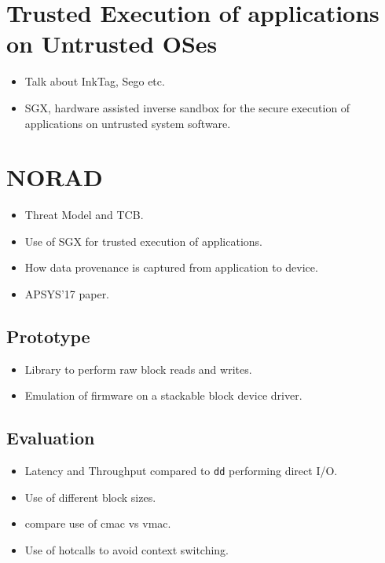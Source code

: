 \documentclass[withindex,glossary]{cam-thesis}
\begin{document}
\section{Trusted Execution of applications on Untrusted OSes}
\begin{itemize}
\item Talk about InkTag, Sego etc.
\item SGX, hardware assisted inverse sandbox for the secure execution of applications on untrusted system software.
\end{itemize}

\section{NORAD}
\begin{itemize}
\item Threat Model and TCB.
\item Use of SGX for trusted execution of applications.
\item How data provenance is captured from application to device.
\item APSYS'17 paper.
\end{itemize}

\subsection{Prototype}
\begin{itemize}
\item Library to perform raw block reads and writes.
\item Emulation of firmware on a stackable block device driver.
\end{itemize}

\subsection{Evaluation}
\begin{itemize}
\item Latency and Throughput compared to \texttt{dd} performing direct I/O.
\item Use of different block sizes.
\item compare use of cmac vs vmac.
\item Use of hotcalls to avoid context switching.
\end{itemize}
\end{document}
